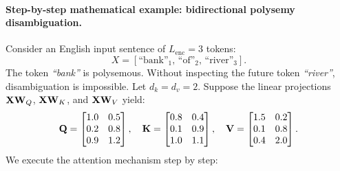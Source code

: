 \documentclass[../../main.tex]{subfiles}
\begin{document}
\paragraph{Step-by-step mathematical example: bidirectional polysemy disambiguation.}
Consider an English input sentence of $L_{\text{enc}} = 3$ tokens:
\begin{equation}
X = [\text{``bank''}_1,\, \text{``of''}_2,\, \text{``river''}_3].
\end{equation}
The token \emph{``bank''} is polysemous. Without inspecting the future token \emph{``river''}, disambiguation is impossible.
Let $d_k = d_v = 2$. Suppose the linear projections $\mathbf{X} \mathbf{W}_Q$, $\mathbf{X} \mathbf{W}_K$, and $\mathbf{X} \mathbf{W}_V$ yield:
\begin{equation}
\label{eq:enc_example_matrices}
\mathbf{Q} = \begin{bmatrix}
1.0 & 0.5 \\
0.2 & 0.8 \\
0.9 & 1.2
\end{bmatrix}, \quad
\mathbf{K} = \begin{bmatrix}
0.8 & 0.4 \\
0.1 & 0.9 \\
1.0 & 1.1
\end{bmatrix}, \quad
\mathbf{V} = \begin{bmatrix}
1.5 & 0.2 \\
0.1 & 0.8 \\
0.4 & 2.0
\end{bmatrix}.
\end{equation}
We execute the attention mechanism step by step:
\end{document}
